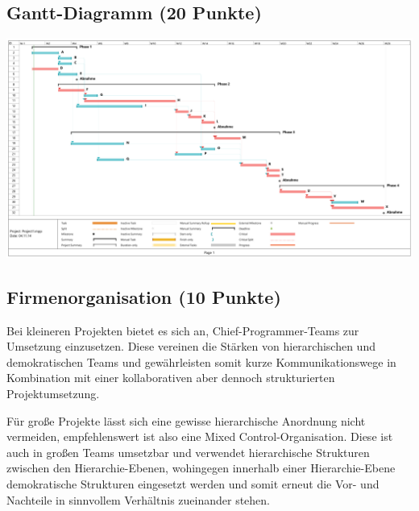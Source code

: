 \documentclass{scrartcl}
\begin{document}
\subsection{Gantt-Diagramm (20 Punkte)}
%
 \includegraphics[width=\linewidth]{gantt.pdf}


\subsection{Firmenorganisation (10 Punkte)}
Bei kleineren Projekten bietet es sich an, Chief-Programmer-Teams zur Umsetzung einzusetzen. Diese vereinen die Stärken von hierarchischen und demokratischen Teams und gewährleisten somit kurze Kommunikationswege in Kombination mit einer kollaborativen aber dennoch strukturierten Projektumsetzung.

Für große Projekte lässt sich eine gewisse hierarchische Anordnung nicht vermeiden, empfehlenswert ist also eine Mixed Control-Organisation. Diese ist auch in großen Teams umsetzbar und verwendet hierarchische Strukturen zwischen den Hierarchie-Ebenen, wohingegen innerhalb einer Hierarchie-Ebene demokratische Strukturen eingesetzt werden und somit erneut die Vor- und Nachteile in sinnvollem Verhältnis zueinander stehen.
\end{document}
